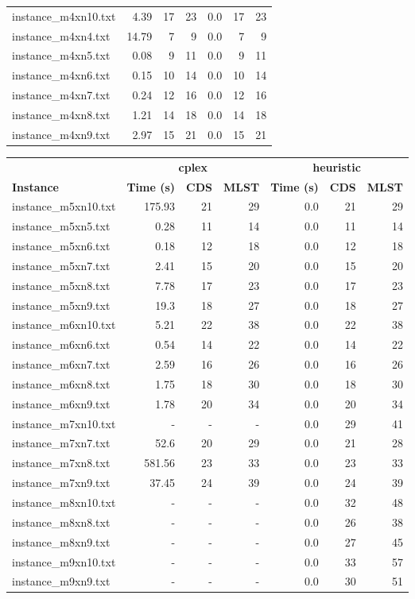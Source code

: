 \documentclass{article}
\begin{document}
\begin{center}
\begin{tabular}{lrrrrrr}
instance\_m4xn10.txt & 4.39 & 17 & 23
 & 0.0 & 17 & 23
\\
instance\_m4xn4.txt & 14.79 & 7 & 9
 & 0.0 & 7 & 9
\\
instance\_m4xn5.txt & 0.08 & 9 & 11
 & 0.0 & 9 & 11
\\
instance\_m4xn6.txt & 0.15 & 10 & 14
 & 0.0 & 10 & 14
\\
instance\_m4xn7.txt & 0.24 & 12 & 16
 & 0.0 & 12 & 16
\\
instance\_m4xn8.txt & 1.21 & 14 & 18
 & 0.0 & 14 & 18
\\
instance\_m4xn9.txt & 2.97 & 15 & 21
 & 0.0 & 15 & 21
\\
\hline\end{tabular}
\end{center}
\newpage
\begin{center}
\renewcommand{\arraystretch}{1.4}
 \begin{tabular}{lrrrrrr}
	\hline
 & \multicolumn{3}{c}{\textbf{cplex}} & \multicolumn{3}{c}{\textbf{heuristic}}\\
\textbf{Instance}  & \textbf{Time (s)} & \textbf{CDS} & \textbf{MLST}   & \textbf{Time (s)} & \textbf{CDS} & \textbf{MLST}  \\\hline

instance\_m5xn10.txt & 175.93 & 21 & 29
 & 0.0 & 21 & 29
\\
instance\_m5xn5.txt & 0.28 & 11 & 14
 & 0.0 & 11 & 14
\\
instance\_m5xn6.txt & 0.18 & 12 & 18
 & 0.0 & 12 & 18
\\
instance\_m5xn7.txt & 2.41 & 15 & 20
 & 0.0 & 15 & 20
\\
instance\_m5xn8.txt & 7.78 & 17 & 23
 & 0.0 & 17 & 23
\\
instance\_m5xn9.txt & 19.3 & 18 & 27
 & 0.0 & 18 & 27
\\
instance\_m6xn10.txt & 5.21 & 22 & 38
 & 0.0 & 22 & 38
\\
instance\_m6xn6.txt & 0.54 & 14 & 22
 & 0.0 & 14 & 22
\\
instance\_m6xn7.txt & 2.59 & 16 & 26
 & 0.0 & 16 & 26
\\
instance\_m6xn8.txt & 1.75 & 18 & 30
 & 0.0 & 18 & 30
\\
instance\_m6xn9.txt & 1.78 & 20 & 34
 & 0.0 & 20 & 34
\\
instance\_m7xn10.txt & - & - & - 
 & 0.0 & 29 & 41
\\
instance\_m7xn7.txt & 52.6 & 20 & 29
 & 0.0 & 21 & 28
\\
instance\_m7xn8.txt & 581.56 & 23 & 33
 & 0.0 & 23 & 33
\\
instance\_m7xn9.txt & 37.45 & 24 & 39
 & 0.0 & 24 & 39
\\
instance\_m8xn10.txt & - & - & - 
 & 0.0 & 32 & 48
\\
instance\_m8xn8.txt & - & - & - 
 & 0.0 & 26 & 38
\\
instance\_m8xn9.txt & - & - & - 
 & 0.0 & 27 & 45
\\
instance\_m9xn10.txt & - & - & - 
 & 0.0 & 33 & 57
\\
instance\_m9xn9.txt & - & - & - 
 & 0.0 & 30 & 51
\\
\hline\end{tabular}
\end{center}
\end{document}

